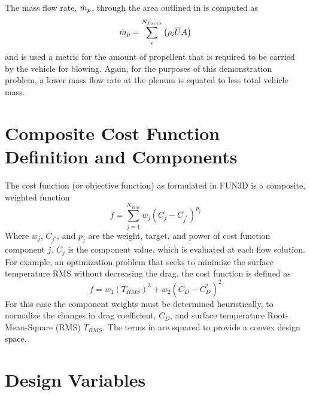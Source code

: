 The mass flow rate, $\dot{m}_p$,
through the area outlined in  is computed as
\begin{equation}
  \dot{m}_p = \sum_{i}^{N_{faces}}\left( \rho_i \overline{U} A \right)
  \label{mass-flow-eqn}
\end{equation}
and is used a metric for the amount of propellent that is required to be carried
by the vehicle for blowing.  Again, for the purposes of this demonstration
problem, a lower mass flow rate at the plenum is equated to less total vehicle
mass.

\section{Composite Cost Function Definition and Components}
\label{cost-func-components}

The cost function (or objective function) as formulated in FUN3D is a composite,
weighted function
\begin{equation}
  f = \sum_{j=1}^{N_{func}}w_j\left( C_j - C_{j^*} \right)^{p_j}
  \label{generic-cost-function}
\end{equation}
Where $w_j$, $C_{j^*}$, and $p_j$ are the weight, target, and power of cost
function component $j$.  $C_j$ is the component value, which is evaluated at
each flow solution.  For example, an optimization problem that seeks to minimize the
surface temperature RMS without decreasing the drag, the cost function is
defined as 
\begin{equation}
  f = w_1\left( T_{RMS} \right)^{2} + w_2\left( C_{D} - C_{D}^{*} \right)^2
  \label{cd-tt-cost-function}
\end{equation}
For this case the component weights must be determined heuristically, to normalize
the changes in drag coefficient, $C_D$, and surface temperature Root-Mean-Square
(RMS) $T_{RMS}$.  The terms in  are squared to provide
a convex design space.

\section{Design Variables}

